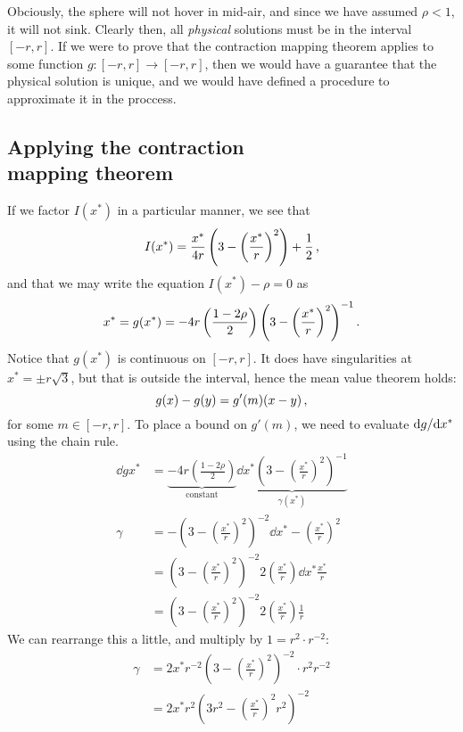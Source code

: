 \documentclass[12pt]{article}
\begin{document}
\begin{multicols}{2}
Obciously, the sphere will not hover in mid-air, and since we
have assumed $\rho < 1$, it will not sink.
Clearly then, all {\em physical} solutions must be in the interval
$[-r, r]$.
If we were to prove that the {\sc contraction mapping theorem}
applies to some function $g: [-r, r] \rightarrow [-r, r]$, then
we would have a guarantee that the physical solution is unique,
and we would have defined a procedure to approximate it
in the proccess.

\subsection*{Applying the contraction\\ mapping theorem}
If we factor $I(x^*)$ in a particular manner, we see that
\[
    I(x^*) = \frac{x^*}{4r} \left(
    3 - \left(\frac{x^*}{r}\right)^2
    \right) + \frac{1}{2} \,\text,
\]
and that we may write the equation $I(x^*) - \rho = 0$ as
\[
    x^* = g(x^*) =
    -4r
    \left(
    \frac{1 - 2\rho}{2}
    \right)
    \left(
    3 - \left(\frac{x^*}{r}\right)^2
    \right)^{-1}
    \text.
\]
Notice that $g(x^*)$ is continuous on $[-r, r]$.
It does have singularities at $x^* = \pm r \sqrt 3$,
but that is outside the interval,
hence the mean value theorem holds:
\[
    g(x) - g(y) = g'(m)(x - y) \,\text,
\]
for some $m \in [-r, r]$.
To place a bound on $g'(m)$, we need to evaluate
${\mathrm d g}/{\mathrm d x^*}$ using the chain rule.
\begin{align*}
    \dd{g}{x^*} &=
    \underbrace{
    -4r
    \left(
    \frac{1 - 2\rho}{2}
    \right)}_\text{constant}
    \underbrace{\dd{}{x^*}
    \left(3 - \left(\frac{x^*}{r}\right)^2\right)^{-1}
    }_{\gamma(x^*)} \\
    \gamma &=
    -\left(3 - \left(\frac{x^*}{r}\right)^2\right)^{-2}
    \dd{}{x^*}
    -\left(\frac{x^*}{r}\right)^2 \\
    &=
    \left(3 - \left(\frac{x^*}{r}\right)^2\right)^{-2}
    2\left(\frac{x^*}{r}\right)
    \dd{}{x^*}
    \frac{x^*}{r} \\
    &=
    \left(3 - \left(\frac{x^*}{r}\right)^2\right)^{-2}
    2\left(\frac{x^*}{r}\right)
    \frac{1}{r}
\end{align*}
We can rearrange this a little, and multiply by $1 = r^2 \cdot r^{-2}$:
\begin{align*}
    \gamma &=
    2 x^* r^{-2} \left(3 - \left(\frac{x^*}{r}\right)^2\right)^{-2}
    \cdot r^2r^{-2} \\
    &=
    2 x^* r^2 \left(3r^2 - \left(\frac{x^*}{r}\right)^2r^2\right)^{-2} \\

\end{align*}
\end{multicols}
\end{document}
